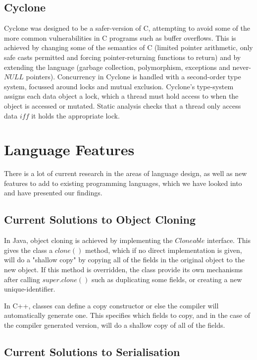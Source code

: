 \documentclass[11pt,a4paper]{report}
\begin{document}
\subsection{Cyclone}
\label{sec:cyclone}

Cyclone was designed to be a safer-version of C, attempting to avoid some of the more common vulnerabilities in C programs such as buffer overflows.
This is achieved by changing some of the semantics of C (limited pointer arithmetic, only safe casts permitted and forcing pointer-returning functions to return) and by extending the language (garbage collection, polymorphism, exceptions and never-$NULL$ pointers).
Concurrency in Cyclone is handled with a second-order type system, focussed around locks and mutual exclusion.
Cyclone's type-system assigns each data object a lock, which a thread must hold access to when the object is accessed or mutated.
Static analysis checks that a thread only access data $iff$ it holds the appropriate lock.

\newpage
\section{Language Features}

There is a lot of current research in the areas of language design, as well as new features to add to existing programming languages, which we have looked into and have presented our findings.

\subsection{Current Solutions to Object Cloning}

In Java, object cloning is achieved by implementing the $Cloneable$ interface\cite{java-cloneable}. This gives the class a $clone()$ method, which if no direct implementation is given, will do a "shallow copy" by copying all of the fields in the original object to the new object.
If this method is overridden, the class provide its own mechanisms after calling $super.clone()$ such as duplicating some fields, or creating a new unique-identifier.

In C++, classes can define a copy constructor or else the compiler will automatically generate one\cite{ansi:03:c++}. This specifies which fields to copy, and in the case of the compiler generated version, will do a shallow copy of all of the fields.

\subsection{Current Solutions to Serialisation}
\end{document}
